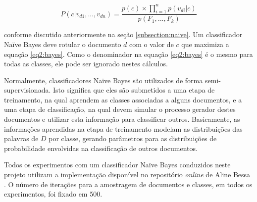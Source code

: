 \begin{equation}
\label{eq2:bayes}
\ensuremath{P(c | v_{d1}, ..., v_{dn}) = \frac{p(c) \times \prod_{i = 1}^{n} p(v_{di} |  c)}{p(F_1, ..., F_k)}}
\end{equation}

conforme discutido anteriormente na seção \ref{subsection:naive}. Um classificador Naïve Bayes deve rotular o documento \ensuremath{d} com o valor de \ensuremath{c} que maximiza a equação \ref{eq2:bayes}. Como o denominador na equação \ref{eq2:bayes} é o mesmo para todas as classes, ele pode ser ignorado nestes cálculos.

Normalmente, classificadores Naïve Bayes são utilizados de forma semi-supervisionada. Isto significa que eles são submetidos a uma etapa de treinamento, na qual aprendem as classes associadas a alguns documentos, e a uma etapa de classificação, na qual devem simular o processo gerador destes documentos e utilizar esta informação para classificar outros. Basicamente, as informações aprendidas na etapa de treinamento modelam as distribuições das palavras de \ensuremath{D} por classe, gerando parâmetros para as distribuições de probabilidade envolvidas na classificação de outros documentos. 

Todos os experimentos com um classificador Naïve Bayes conduzidos neste projeto utilizam a implementação disponível no repositório \emph{online} de Aline Bessa \cite{alibezz-nb}. O número de iterações para a amostragem de documentos e classes, em todos os experimentos, foi fixado em 500.






 

